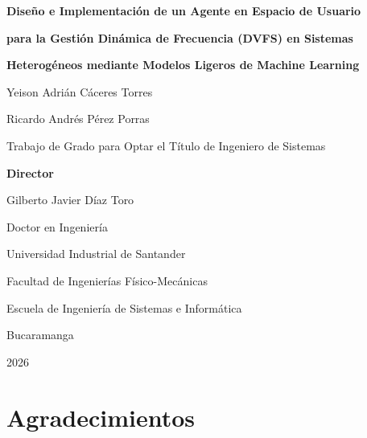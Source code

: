 \documentclass[12pt,oneside,spanish]{book}
\begin{document}

\begin{titlepage}
    \centering
    \vspace*{1cm}

    {\Large \textbf{Diseño e Implementación de un Agente en Espacio de Usuario}}

    \vspace{0.3cm}

    {\Large \textbf{para la Gestión Dinámica de Frecuencia (DVFS) en Sistemas}}

    \vspace{0.3cm}

    {\Large \textbf{Heterogéneos mediante Modelos Ligeros de Machine Learning}}

    \vspace{2cm}

    {\large Yeison Adrián Cáceres Torres}

    {\large Ricardo Andrés Pérez Porras}

    \vspace{2cm}

    {\large Trabajo de Grado para Optar el Título de Ingeniero de Sistemas}

    \vspace{2cm}

    {\large \textbf{Director}}

    {\large Gilberto Javier Díaz Toro}

    {\large Doctor en Ingeniería}

    \vspace{\fill}

    {\large Universidad Industrial de Santander}

    {\large Facultad de Ingenierías Físico-Mecánicas}

    {\large Escuela de Ingeniería de Sistemas e Informática}

    {\large Bucaramanga}

    {\large 2026}

\end{titlepage}


\chapter*{Agradecimientos}
\end{document}
